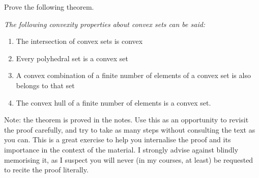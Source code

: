 Prove the following theorem.

\begin{theorem*} 
	\emph{The following convexity properties about convex sets can be said:}
	\begin{enumerate}
		\item The intersection of convex sets is convex
		\item Every polyhedral set is a convex set
		\item A convex combination of a finite number of elements of a convex set is also belongs to that set
		\item The convex hull of a finite number of elements is a convex set.			
	\end{enumerate}
\end{theorem*}

Note: the theorem is proved in the notes. Use this as an opportunity to revisit the proof carefully, and try to take as many steps without consulting the text as you can. This is a great exercise to help you internalise the proof and its importance in the context of the material. I strongly advise against blindly memorising it, as I suspect you will never (in my courses, at least) be requested to recite the proof literally.
